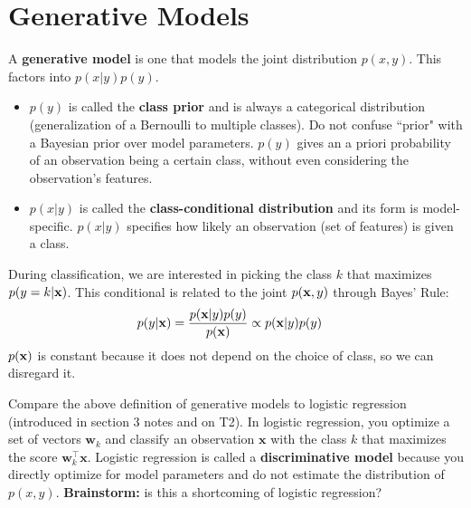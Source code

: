 \documentclass[11pt,letterpaper]{article}
\begin{document}



\mbox{}

\section{Generative Models}


A \textbf{generative model} is one that models the joint distribution $p(x,y)$. 
This factors into $p(x|y)p(y)$. 
\begin{itemize}
    \item $p(y)$ is called the \textbf{class prior} and is always
    a categorical distribution (generalization of a Bernoulli to multiple classes).
    Do not confuse ``prior" with a Bayesian prior over model parameters.
    $p(y)$ gives an a priori probability of an observation being a certain class, without even
    considering the observation's features.
    \item $p(x|y)$ is called the \textbf{class-conditional distribution} and
    its form is model-specific.
    $p(x|y)$ specifies how likely an observation (set of features) is given a class.
\end{itemize}
\noindent During classification, we are interested in picking the class $k$ that maximizes
$p(y=k|\mathbf{x})$. This conditional is related to the joint $p(\mathbf{x}, y)$ through Bayes' Rule: 
\begin{align*}
    p(y|\mathbf{x}) &= \frac{p(\mathbf{x}|y)p(y)}{p(\mathbf{x})} \propto p(\mathbf{x} | y)p(y)
\end{align*}
$p(\mathbf{x})$ is constant because it does not depend on the choice of class, so we can disregard it.

\noindent Compare the above definition of generative models to logistic regression (introduced in section 3 notes and on T2).
In logistic regression, you optimize a set of vectors $\mathbf{w}_k$ and classify an observation
$\mathbf{x}$ with the class $k$ that maximizes the score $\mathbf{w}_k^\top\mathbf{x}$. Logistic regression
is called a \textbf{discriminative model} because you directly optimize for model parameters and do not
estimate the distribution of $p(x,y)$. \textbf{Brainstorm:} is this a shortcoming of logistic regression?
\end{document}
